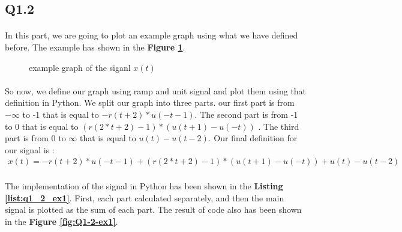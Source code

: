 \subsection{Q1.2}

\paragraph{}In this part, we are going to plot an example 
graph using what we have defined before. The example has 
shown in the \textbf{Figure \ref{fig:ex1}}.

\begin{figure}[H]
 \centering
{}
\caption{example graph of the siganl $x(t)$}
  \label{fig:ex1}
\end{figure}

\paragraph{}So now, we define our graph using ramp and unit 
signal and plot them using that definition in Python. We 
split our graph into three parts. our first part is from 
$-\infty$ to -1 that is equal to $-r(t+2) * u(-t-1)$. The 
second part is from -1 to 0 that is equal to $(r(2*t+2)-1) *(u(t+1)-u(-t))$
. The third part is from 0 to $\infty$ that is equal to 
$u(t) -u(t-2)$. Our final definition for our signal is :
\begin{align}
  x(t) = -r(t+2) * u(-t-1) + (r(2*t+2)-1) *(u(t+1)-u(-t)) + u(t) -u(t-2)
 \end{align}
 \paragraph{}The implementation of the signal in Python
  has been shown in the \textbf{Listing \ref{list:q1_2_ex1}}. First, each 
  part calculated separately, and then the main signal 
  is plotted as the sum of each part. The result of code 
  also has been shown in the \textbf{Figure \ref{fig:Q1-2-ex1}}.



